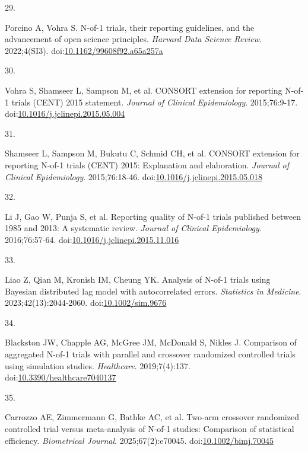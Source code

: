 \documentclass[
  11pt,
]{article}
\newlength{\cslhangindent}
\newlength{\csllabelwidth}
\newenvironment{CSLReferences}[2] %
 {\begin{list}{}{%
  \setlength{\itemindent}{0pt}
  \setlength{\leftmargin}{0pt}
  \setlength{\parsep}{0pt}
  \ifodd #1
   \setlength{\leftmargin}{\cslhangindent}
   \setlength{\itemindent}{-1\cslhangindent}
  \fi
  \setlength{\itemsep}{#2\baselineskip}}}
 {\end{list}}
\newcommand{\CSLLeftMargin}[1]{\parbox[t]{\csllabelwidth}{\strut#1\strut}}
\newcommand{\CSLRightInline}[1]{\parbox[t]{\linewidth - \csllabelwidth}{\strut#1\strut}}
\begin{document}
\begin{CSLReferences}{0}{1}
\CSLLeftMargin{29. }%
\CSLRightInline{Porcino A, Vohra S. {N}-of-1 trials, their reporting guidelines, and the advancement of open science principles. \emph{Harvard Data Science Review}. 2022;4(SI3). doi:\href{https://doi.org/10.1162/99608f92.a65a257a}{10.1162/99608f92.a65a257a}}

\CSLLeftMargin{30. }%
\CSLRightInline{{Vohra S, Shamseer L, Sampson M, et al.} {CONSORT} extension for reporting {N}-of-1 trials ({CENT}) 2015 statement. \emph{Journal of Clinical Epidemiology}. 2015;76:9-17. doi:\href{https://doi.org/10.1016/j.jclinepi.2015.05.004}{10.1016/j.jclinepi.2015.05.004}}

\CSLLeftMargin{31. }%
\CSLRightInline{{Shamseer L, Sampson M, Bukutu C, Schmid CH, et al.} {CONSORT} extension for reporting {N}-of-1 trials ({CENT}) 2015: Explanation and elaboration. \emph{Journal of Clinical Epidemiology}. 2015;76:18-46. doi:\href{https://doi.org/10.1016/j.jclinepi.2015.05.018}{10.1016/j.jclinepi.2015.05.018}}

\CSLLeftMargin{32. }%
\CSLRightInline{Li J, Gao W, Punja S, et al. Reporting quality of {N}-of-1 trials published between 1985 and 2013: A systematic review. \emph{Journal of Clinical Epidemiology}. 2016;76:57-64. doi:\href{https://doi.org/10.1016/j.jclinepi.2015.11.016}{10.1016/j.jclinepi.2015.11.016}}

\CSLLeftMargin{33. }%
\CSLRightInline{Liao Z, Qian M, Kronish IM, Cheung YK. Analysis of {N}-of-1 trials using {B}ayesian distributed lag model with autocorrelated errors. \emph{Statistics in Medicine}. 2023;42(13):2044-2060. doi:\href{https://doi.org/10.1002/sim.9676}{10.1002/sim.9676}}

\CSLLeftMargin{34. }%
\CSLRightInline{Blackston JW, Chapple AG, McGree JM, McDonald S, Nikles J. Comparison of aggregated {N}-of-1 trials with parallel and crossover randomized controlled trials using simulation studies. \emph{Healthcare}. 2019;7(4):137. doi:\href{https://doi.org/10.3390/healthcare7040137}{10.3390/healthcare7040137}}

\CSLLeftMargin{35. }%
\CSLRightInline{{Carrozzo AE, Zimmermann G, Bathke AC, et al.} Two-arm crossover randomized controlled trial versus meta-analysis of {N}-of-1 studies: Comparison of statistical efficiency. \emph{Biometrical Journal}. 2025;67(2):e70045. doi:\href{https://doi.org/10.1002/bimj.70045}{10.1002/bimj.70045}}


\end{CSLReferences}
\end{document}
